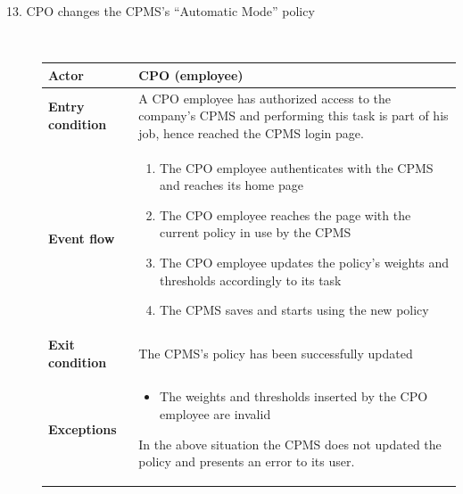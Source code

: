 \documentclass[11pt]{article}
\begin{document}
\begin{description}
    \item [13. CPO changes the CPMS's “Automatic Mode” policy] \hfill \\
    \begin{table}[H]
        \centering
        \setlength{\tabcolsep}{18pt}
        \renewcommand{\arraystretch}{1.4}
        \begin{tabularx}{\textwidth}{|>{\hsize=0.5\hsize}X|>{\hsize=1.5\hsize}X|}
            \hline
            \textbf{Actor} & CPO (employee) \\
            \hline
            \textbf{Entry condition} & A CPO employee has authorized access to the company's CPMS and performing this task is part of his job, hence reached the CPMS login page. \\
            \hline
            \textbf{Event flow} & 
                \begin{minipage}[t]{\hsize}
                \begin{enumerate}[topsep=0pt, leftmargin=*]
                    \item The CPO employee authenticates with the CPMS and reaches its home page
                    \item The CPO employee reaches the page with the current policy in use by the CPMS
                    \item The CPO employee updates the policy's weights and thresholds accordingly to its task
                    \item The CPMS saves and starts using the new policy
                \end{enumerate}
                \end{minipage}
                \vspace{6pt}
            \\
            \hline
            \textbf{Exit condition} & The CPMS's policy has been successfully updated \\
            \hline
            \textbf{Exceptions} & 
                \begin{minipage}[t]{\hsize}
                \vspace{0pt}
                \begin{itemize}[topsep=0pt, leftmargin=*]
                    \item The weights and thresholds inserted by the CPO employee are invalid
                \end{itemize}
                \vspace{8pt}
                \end{minipage}
                In the above situation the CPMS does not updated the policy and presents an error to its user.
                \vspace{6pt}
            \\
            \hline
        \end{tabularx}
    \end{table}
\end{description}
\end{document}
